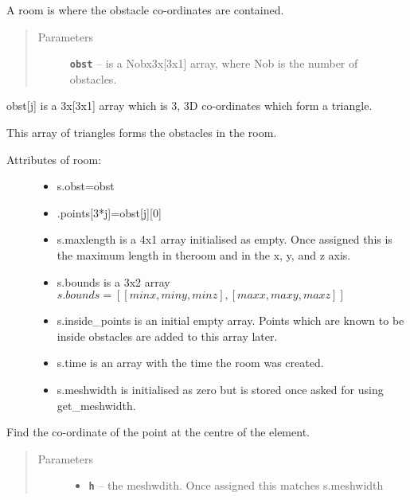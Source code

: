 \documentclass[letterpaper,10pt,english]{sphinxmanual}
\begin{document}
\begin{fulllineitems}
\label{index:Room.room}
A room is where the obstacle co-ordinates are contained.
\begin{quote}\begin{description}
\item[{Parameters}] \leavevmode
\textbf{\texttt{obst}} -- is a Nobx3x{[}3x1{]} array, where Nob is the number of     obstacles.

\end{description}\end{quote}

obst{[}j{]} is a 3x{[}3x1{]} array which is 3, 3D co-ordinates   which form a triangle.

This array of triangles forms the obstacles in the room.
\begin{description}
\item[{Attributes of room:}] \leavevmode\begin{itemize}
\item {} 
s.obst=obst

\item {} 
.points{[}3*j{]}=obst{[}j{]}{[}0{]}

\item {} 
s.maxlength is a 4x1 array initialised as empty. Once assigned     this is the maximum length in theroom and in the x, y, and z axis.

\item {} 
s.bounds is a 3x2 array     \(s.bounds= [ [minx, miny, minz], [maxx,maxy,maxz]]\)

\item {} 
s.inside\_points is an initial empty array. Points which are known     to be inside obstacles are added to this array later.

\item {} 
s.time is an array with the time the room was created.

\item {} 
s.meshwidth is initialised as zero but is stored once asked for     using get\_meshwidth.

\end{itemize}

\end{description}

\begin{fulllineitems}
\label{index:Room.room.coordinate}
Find the co-ordinate of the point at the centre of the element.
\begin{quote}\begin{description}
\item[{Parameters}] \leavevmode\begin{itemize}
\item {} 
\textbf{\texttt{h}} -- the meshwdith. Once assigned this matches s.meshwidth


\end{itemize}
\end{description}
\end{quote}
\end{fulllineitems}
\end{fulllineitems}
\end{document}
